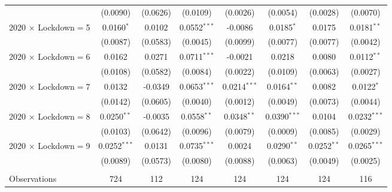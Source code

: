 \begin{tabular}{lccccccc}
                                                & (0.0090)        & (0.0626)      & (0.0109)       & (0.0026)              & (0.0054)        & (0.0028)       & (0.0070)\\
   2020 $\times$ Lockdown$=$5                  & 0.0160$^{*}$    & 0.0102        & 0.0552$^{***}$ & -0.0086               & 0.0185$^{*}$    & 0.0175         & 0.0181$^{**}$\\
                                                & (0.0087)        & (0.0583)      & (0.0045)       & (0.0099)              & (0.0077)        & (0.0077)       & (0.0042)\\
   2020 $\times$ Lockdown$=$6                  & 0.0162          & 0.0271        & 0.0711$^{***}$ & -0.0021               & 0.0218          & 0.0080         & 0.0112$^{**}$\\
                                                & (0.0108)        & (0.0582)      & (0.0084)       & (0.0022)              & (0.0109)        & (0.0063)       & (0.0027)\\
   2020 $\times$ Lockdown$=$7                  & 0.0132          & -0.0349       & 0.0653$^{***}$ & 0.0214$^{***}$        & 0.0164$^{**}$   & 0.0082         & 0.0122$^{*}$\\
                                                & (0.0142)        & (0.0605)      & (0.0040)       & (0.0012)              & (0.0049)        & (0.0073)       & (0.0044)\\
   2020 $\times$ Lockdown$=$8                  & 0.0250$^{**}$   & -0.0035       & 0.0558$^{**}$  & 0.0348$^{**}$         & 0.0390$^{***}$  & 0.0104         & 0.0232$^{***}$\\
                                                & (0.0103)        & (0.0642)      & (0.0096)       & (0.0079)              & (0.0009)        & (0.0085)       & (0.0029)\\
   2020 $\times$ Lockdown$=$9                  & 0.0252$^{***}$  & 0.0131        & 0.0735$^{***}$ & 0.0024                & 0.0290$^{**}$   & 0.0252$^{**}$  & 0.0265$^{***}$\\
                                                & (0.0089)        & (0.0573)      & (0.0080)       & (0.0088)              & (0.0063)        & (0.0049)       & (0.0025)\\
                                                &                 &               &                &                       &                 &                &  \\
   Observations                                 & 724             & 112           & 124            & 124                   & 124             & 124            & 116\\

\end{tabular}
